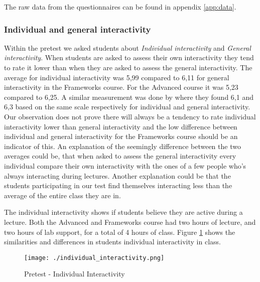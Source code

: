The raw data from the questionnaires can be found in appendix \ref{app:data}.

\subsubsection*{Individual and general interactivity}

Within the pretest we asked students about \emph{Individual interactivity} and \emph{General interactivity}. When students are asked to assess their own interactivity they tend to rate it lower than when they are asked to assess the general interactivity. The average for individual interactivity was 5,99 compared to 6,11 for general interactivity in the Frameworks course. For the Advanced course it was 5,23 compared to 6,25. A similar measurement was done by  where they found 6,1 and 6,3 based on the same scale respectively for individual and general interactivity. Our observation does not prove there will always be a tendency to rate individual interactivity lower than general interactivity and the low difference between individual and general interactivity for the Frameworks course should be an indicator of this. An explanation of the seemingly difference between the two averages could be, that when asked to assess the general interactivity every individual compare their own interactivity with the ones of a few people who's always interacting during lectures. Another explanation could be that the students participating in our test find themselves interacting less than the average of the entire class they are in.


The individual interactivity shows if students believe they are active during a lecture. Both the Advanced and Frameworks course had two hours of lecture, and two hours of lab support, for a total of 4 hours of class. Figure \ref{fig:individual_interactivity} shows the similarities and differences in students individual interactivity in class. 

 \begin{figure}[H]
  \centering
     \texttt{[image: ./individual\_interactivity.png]}
     \caption{Pretest - Individual Interactivity}
     \label{fig:individual_interactivity}
 \end{figure}

